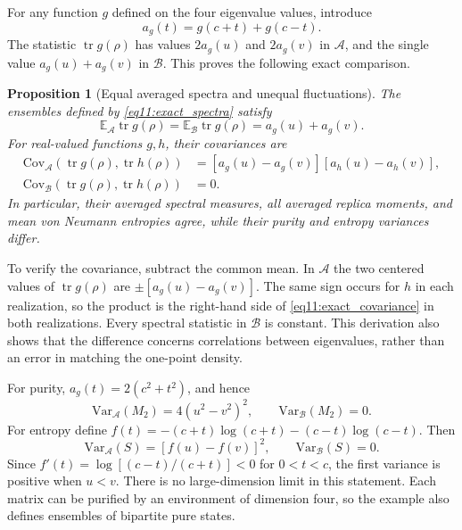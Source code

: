 \documentclass[11pt,letterpaper]{article}
\theoremstyle{plain}
\newtheorem{proposition}[theorem]{Proposition}
\theoremstyle{definition}
\theoremstyle{remark}
\newcommand{\E}{\mathbb{E}}
\newcommand{\Var}{\text{Var}}
\newcommand{\Cov}{\text{Cov}}
\DeclareMathOperator{\tr}{tr}
\begin{document}
For any function $g$ defined on the four eigenvalue values, introduce
\begin{equation}
 a_g(t)=g(c+t)+g(c-t).
 \label{eq11:pair_statistic}
\end{equation}
The statistic $\tr g(\rho)$ has values $2a_g(u)$ and $2a_g(v)$ in
$\mathcal A$, and the single value $a_g(u)+a_g(v)$ in $\mathcal B$.
This proves the following exact comparison.

\begin{proposition}[Equal averaged spectra and unequal fluctuations]
\label{prop11:exact_ensembles}
The ensembles defined by \eqref{eq11:exact_spectra} satisfy
\begin{equation}
 \E_{\mathcal A}\tr g(\rho)=\E_{\mathcal B}\tr g(\rho)
 =a_g(u)+a_g(v).
 \label{eq11:linear_matching}
\end{equation}
For real-valued functions $g,h$, their covariances are
\begin{align}
 \Cov_{\mathcal A}(\tr g(\rho),\tr h(\rho))
 &=[a_g(u)-a_g(v)][a_h(u)-a_h(v)],
 \label{eq11:exact_covariance}\\
 \Cov_{\mathcal B}(\tr g(\rho),\tr h(\rho))&=0.
 \nonumber
\end{align}
In particular, their averaged spectral measures, all averaged replica
moments, and mean von Neumann entropies agree, while their purity and
entropy variances differ.
\end{proposition}

To verify the covariance, subtract the common mean. In $\mathcal A$
the two centered values of $\tr g(\rho)$ are
$\pm[a_g(u)-a_g(v)]$. The same sign occurs for $h$ in each realization,
so the product is the right-hand side of
\eqref{eq11:exact_covariance} in both realizations. Every spectral
statistic in $\mathcal B$ is constant. This derivation also shows that
the difference concerns correlations between eigenvalues, rather than
an error in matching the one-point density.

For purity, $a_g(t)=2(c^2+t^2)$, and hence
\begin{equation}
 \Var_{\mathcal A}(M_2)=4(u^2-v^2)^2,
 \qquad \Var_{\mathcal B}(M_2)=0.
 \label{eq11:purity_variance}
\end{equation}
For entropy define
$f(t)=-(c+t)\log(c+t)-(c-t)\log(c-t)$. Then
\begin{equation}
 \Var_{\mathcal A}(S)=[f(u)-f(v)]^2,
 \qquad \Var_{\mathcal B}(S)=0.
 \label{eq11:entropy_variance}
\end{equation}
Since $f'(t)=\log[(c-t)/(c+t)]<0$ for $0<t<c$, the first variance
is positive when $u<v$. There is no large-dimension limit in this
statement. Each matrix can be purified by an environment of dimension
four, so the example also defines ensembles of bipartite pure states.
\end{document}
